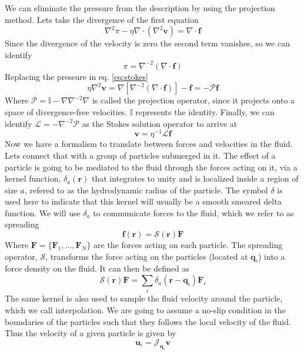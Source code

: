 \documentclass[ twoside,openright,titlepage,numbers=noenddot,%
headinclude,footinclude,cleardoublepage=empty,abstract=on,
BCOR=5mm,paper=a4,fontsize=11pt, dvipsnames
]{scrreprt}
\renewcommand{\vec}[1]{\bm{#1}}
\newcommand{\oper}[1]{\mathcal{#1}}
\newcommand{\ppos}{q}
\newcommand{\pvel}{u}
\newcommand{\fpos}{r}
\newcommand{\fvel}{v}
\begin{document}
We can eliminate the pressure from the description by using the projection method. Lets take the divergence of the first equation
\begin{equation}
  \nabla^2 \pi - \eta \nabla\cdot(\nabla^2\vec{\fvel}) =  \nabla\cdot\vec{f}
\end{equation}
Since the divergence of the velocity is zero the second term vanishes, so we can identify
\begin{equation}
  \pi = \nabla^{-2}(\nabla\cdot\vec{f})
\end{equation}
Replacing the pressure in eq. \eqref{eq:stokes}
\begin{equation}
  \eta\nabla^2\vec{\fvel} = \nabla\left[\nabla^{-2}(\nabla\cdot\vec{f})\right] - \vec{f} = -\oper{P} \vec{f}
\end{equation}
Where $\oper{P}  =  \mathbb{I} - \nabla\nabla^{-2}\nabla$ is called the projection operator, since it projects onto a space of divergence-free velocities. $\mathbb{I}$ represents the identity. Finally, we can identify $\oper{L} = -\nabla^{-2}\oper{P}$ as the Stokes solution operator to arrive at
\begin{equation}
  \vec{\fvel} = \eta^{-1}\oper{L}\vec{f}
\end{equation}
Now we have a formalism to translate between forces and velocities in the fluid. Lets connect that with a group of particles submerged in it.
The effect of a particle is going to be mediated to the fluid through the forces acting on it, via a kernel function, $\delta_a(\vec{r})$ that integrates to unity and is localized inside a region of size $a$, refered to as the hydrodynamic radius of the particle. The symbol $\delta$ is used here to indicate that this kernel will usually be a smooth smeared delta function. We will use $\delta_a$ to communicate forces to the fluid, which we refer to as spreading
\begin{equation}
  \vec{f}(\vec{\fpos}) = \oper{S}(\vec{\fpos})\vec{F}
\end{equation}
Where $\vec{F} =\{\vec{F}_1,...,\vec{F}_N\}$ are the forces acting on each particle.
The spreading operator, $\oper{S}$, transforms the force acting on the particles (located at $\vec{\ppos}_i$) into a force density on the fluid. It can then be defined as
\begin{equation}
  \oper{S}(\vec{\fpos})\vec{F} = \sum_i\delta_a(\vec{\fpos}-\vec{\ppos}_i)\vec{F}_i
\end{equation}
The same kernel is also used to sample the fluid velocity around the particle, which we call interpolation. We are going to assume a no-slip condition in the boundaries of the particles such that they follows the local velocity of the fluid. Thus the velocity of a given particle is given by
\begin{equation}
  \label{eq:bdhifvel}
  \vec{\pvel}_i= \oper{J}_{\vec{\ppos}_i}\vec{\fvel}
\end{equation}
  
\end{document}
